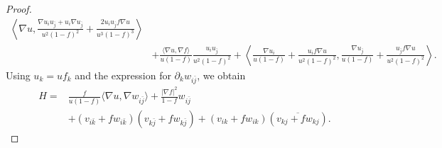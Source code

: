 \documentclass[10pt,a4paper]{amsart}
\begin{document}
\begin{proof}
\[\begin{aligned}
          \left\langle
            \nabla u, \frac{\nabla u_i u_{\bar{j}}+u_i \nabla u_{\bar j}}{u^2(1-f)^2}
          +\frac{2 u_i u_{\bar{j}} f\nabla u }{u^3(1-f)^3}
          \right\rangle\\
        & + \frac{\langle\nabla u,\nabla f\rangle}{u(1-f)}\frac{u_i u_{\bar{j}}}{u^{2}(1-f)^{2}}
          +\left\langle
            \frac{\nabla u_i}{u(1-f)}
            +\frac{u_{i}f\nabla u}{u^{2}(1-f)^{2}}, \frac{\nabla u_{\bar{j}}}{u(1-f)}
            +\frac{u_{\bar{j}}f \nabla u}{u^{2}(1-f)^2}
            \right\rangle.
      \end{aligned}
    \]
  Using $u_k = uf_k$ and the expression for $\partial_k w_{i \bar{j}}$, we obtain 
  \[
  \begin{aligned}
    H= & \frac{f}{u(1-f)}\langle\nabla u, \nabla w_{i \bar{j}}\rangle
      +\frac{|\nabla f|^2}{1-f} w_{i \bar{j}} \\
    & +\left(v_{i \bar{k}}+f w_{i \bar{k}}\right)\left(v_{k \bar{j}} + f w_{k \bar{j}}\right)
      +\left(v_{i k}+f w_{i k}\right)\left(\overline{v_{k j}+f w_{k j}}\right). 
  \end{aligned}
  \]
\end{proof}
\end{document}
